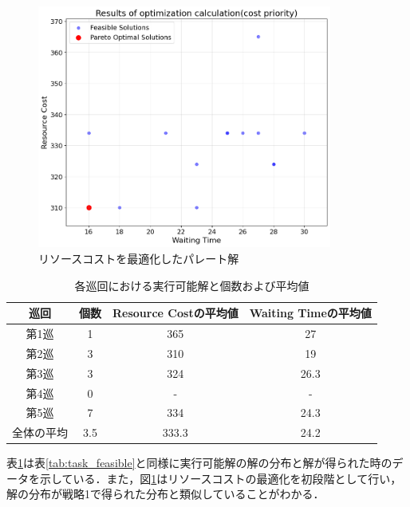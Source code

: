 \begin{figure}[H]
    \centering
    \includegraphics[width=0.8\linewidth, height=8cm]{./images/cost_job5.png}
    \caption{リソースコストを最適化したパレート解}
    \label{fig:fig8}
\end{figure}
\clearpage

\begin{table}[ht]
    \centering
    \vspace{-0.3cm}
    \caption{各巡回における実行可能解と個数および平均値}
    \begin{tabular}{|c|c|c|c|}
        \hline
         巡回 & 個数 & Resource Costの平均値 & Waiting Timeの平均値 \\
        \hline
        第1巡 & 1 & 365 & 27 \\
        \hline
        第2巡 & 3 & 310 & 19 \\
        \hline
        第3巡 & 3 & 324 & 26.3 \\
        \hline
        第4巡 & 0 & - & - \\
        \hline
        第5巡 & 7 & 334 & 24.3 \\
        \hline
        全体の平均 & 3.5 & 333.3 & 24.2 \\
        \hline
    \end{tabular}
    \label{tab:cost_feasible}
\end{table}

表\ref{tab:cost_feasible}は表\ref{tab:task_feasible}と同様に実行可能解の解の分布と解が得られた時のデータを示している．また，図\ref{fig:fig8}はリソースコストの最適化を初段階として行い，解の分布が戦略1で得られた分布と類似していることがわかる．

